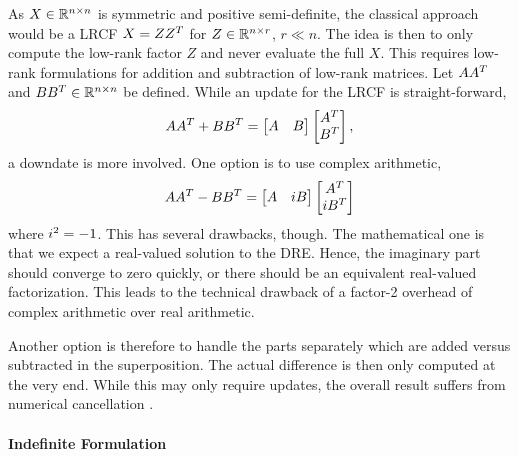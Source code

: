 As $X\in\mathbb{R}^{n\times n}$ is symmetric and positive semi-definite,
the classical approach would be a \ac{LRCF} $X=ZZ^T$
for $Z \in\mathbb{R}^{n\times r}$, $r\ll n$.
The idea is then to only compute the low-rank factor $Z$
and never evaluate the full $X$.
This requires low-rank formulations for addition and subtraction of low-rank matrices.
Let $AA^T$ and $BB^T \in\mathbb{R}^{n\times n}$ be defined.
While an update for the \ac{LRCF} is straight-forward,
\begin{equation}
  AA^T + BB^T =
  \begin{bmatrix}
    A & B
  \end{bmatrix}
  \begin{bmatrix}
    A^T \\ B^T
  \end{bmatrix}
  ,
\end{equation}
a downdate is more involved.
One option is to use complex arithmetic, \ie
\begin{equation}
  AA^T - BB^T =
  \begin{bmatrix}
    A & i B
  \end{bmatrix}
  \begin{bmatrix}
    A^T \\ i B^T
  \end{bmatrix}
\end{equation}
where $i^2=-1$.
This has several drawbacks, though.
The mathematical one is that we expect a real-valued solution to the \ac{DRE}.
Hence, the imaginary part should converge to zero quickly,
or there should be an equivalent real-valued factorization.
This leads to the technical drawback of a factor-2 overhead of complex arithmetic over real arithmetic.

Another option is therefore to handle the parts separately which are added versus subtracted in the superposition.
The actual difference is then only computed at the very end.
While this may only require updates,
the overall result suffers from numerical cancellation
\cite[50]{Lang2015}
\cite[\pno~186, thesis~10]{Lang2017}.

\paragraph{Indefinite Formulation}

